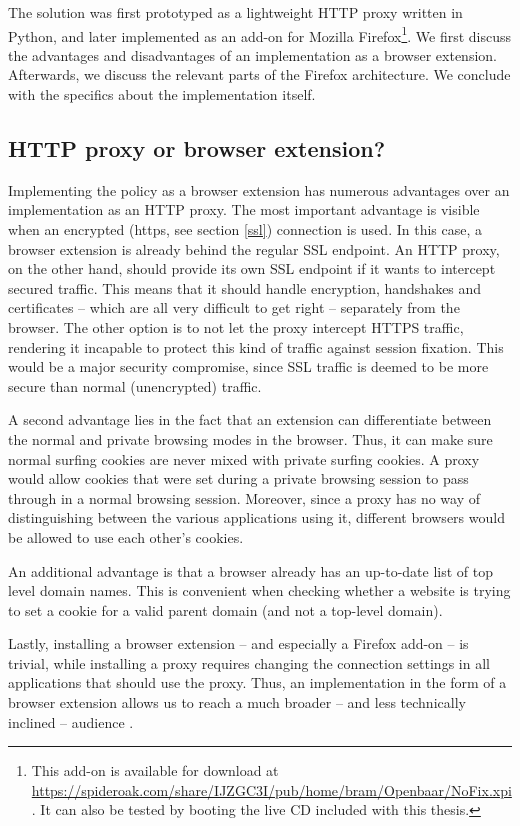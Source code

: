 The solution was first prototyped as a lightweight HTTP proxy written in Python, and later implemented as an add-on for Mozilla Firefox\footnote{This add-on is available for download at \url{https://spideroak.com/share/IJZGC3I/pub/home/bram/Openbaar/NoFix.xpi}. It can also be tested by booting the live CD included with this thesis.}. We first discuss the advantages and disadvantages of an implementation as a browser extension. Afterwards, we discuss the relevant parts of the Firefox architecture. We conclude with the specifics about the implementation itself.

\subsection{HTTP proxy or browser extension?}\label{proxy-or-extension}

Implementing the policy as a browser extension has numerous advantages over an implementation as an HTTP proxy. The most important advantage is visible when an encrypted (\gls{https}, see section \ref{ssl}) connection is used. In this case, a browser extension is already behind the regular SSL endpoint. An HTTP proxy, on the other hand, should provide its own SSL endpoint if it wants to intercept secured traffic. This means that it should handle encryption, handshakes and certificates -- which are all very difficult to get right -- separately from the browser. The other option is to not let the proxy intercept HTTPS traffic, rendering it incapable to protect this kind of traffic against session fixation. This would be a major security compromise, since SSL traffic is deemed to be more secure than normal (unencrypted) traffic.

A second advantage lies in the fact that an extension can differentiate between the normal and private browsing modes in the browser. Thus, it can make sure normal surfing cookies are never mixed with private surfing cookies. A proxy would allow cookies that were set during a private browsing session to pass through in a normal browsing session. Moreover, since a proxy has no way of distinguishing between the various applications using it, different browsers would be allowed to use each other's cookies.

An additional advantage is that a browser already has an up-to-date list of top level domain names. This is convenient when checking whether a website is trying to set a cookie for a valid parent domain (and not a top-level domain).

Lastly, installing a browser extension -- and especially a Firefox add-on -- is trivial, while installing a proxy requires changing the connection settings in all applications that should use the proxy. Thus, an implementation in the form of a browser extension allows us to reach a much broader -- and less technically inclined -- audience \cite{Bonne2011}.

